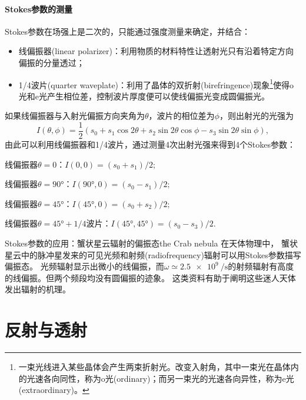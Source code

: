 \paragraph{Stokes参数的测量}

Stokes参数在场强上是二次的，只能通过强度测量来确定，并结合：
\begin{itemize}
    \item 线偏振器(linear polarizer)：利用物质的材料特性让透射光只有沿着特定方向偏振的分量透过；
    \item 1/4波片(quarter waveplate)：利用了晶体的双折射(birefringence)现象\footnote{一束光线进入某些晶体会产生两束折射光。改变入射角，其中一束光在晶体内的光速各向同性，称为o光(ordinary)；而另一束光的光速各向异性，称为e光(extraordinary)。}使得o光和e光产生相位差，控制波片厚度便可以使线偏振光变成圆偏振光。
\end{itemize}
如果线偏振器与入射光偏振方向夹角为$\theta$，波片的相位差为$\phi$，则出射光的光强为
\begin{equation}
    \label{eq:ed-polarimeter-intensity}
    I(\theta,\phi) = \frac12(s_0 + s_1\cos2\theta + s_2\sin2\theta\cos\phi - s_3\sin2\theta\sin\phi),
\end{equation}
由此可以利用线偏振器和1/4波片，通过测量4次出射光强来得到4个Stokes参数：
\begin{compactitem}
	\item 线偏振器$\theta = 0$：$I(0,0) = (s_0 + s_1)/2;$
    \item 线偏振器$\theta = \ang{90}$：$I(\ang{90},0) = (s_0 - s_1)/2;$
    \item 线偏振器$\theta = \ang{45}$：$I(\ang{45},0) = (s_0 + s_2)/2;$
    \item 线偏振器$\theta = \ang{45} + 1/4$波片：$I(\ang{45},\ang{45}) = (s_0 - s_3)/2.$
\end{compactitem}

\begin{example}
    {Stokes参数的应用：蟹状星云辐射的偏振态}{the Crab nebula}
    在天体物理中，
    蟹状星云中的脉冲星发来的可见光频和射频(radiofrequency)辐射可以用Stokes参数描写偏振态。
    光频辐射显示出微小的线偏振，而$\omega \simeq \qty{2.5e9}{\per\second}$的射频辐射有高度的线偏振。但两个频段均没有圆偏振的迹象。
    这类资料有助于阐明这些迷人天体发出辐射的机理。
\end{example}

\section{反射与透射}

